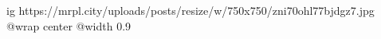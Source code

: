  
 
 
 
 

\ifcmt
  ig https://mrpl.city/uploads/posts/resize/w/750x750/zni70ohl77bjdgz7.jpg
  @wrap center
  @width 0.9
\fi
